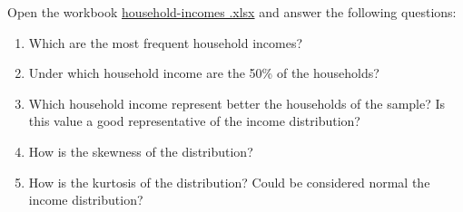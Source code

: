 \begin{enumerate}[leftmargin=*,resume]
Open the workbook
\href{http://aprendeconalf.es/office/excel/exercises/descriptive-statistics/household-incomes.xlsx}{\textsf{household-incomes
.xlsx}} and answer the following questions:
\begin{enumerate}
\item Which are the most frequent household incomes?
\item Under which household income are the 50\% of the households? 
\item Which household income represent better the households of the sample? Is this value a good representative
of the income distribution?
\item How is the skewness of the distribution?
\item How is the kurtosis of the distribution? Could be considered normal the income distribution?
\end{enumerate}

\end{enumerate}